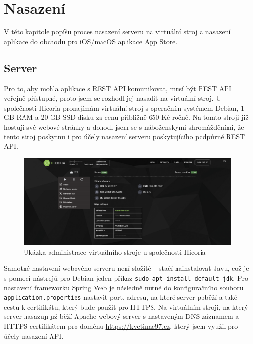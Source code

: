 \chapter{Nasazení}

\begin{chapterabstract}
    V této kapitole popíšu proces nasazení serveru na virtuální stroj a nasazení aplikace do obchodu pro iOS/macOS aplikace App Store.
\end{chapterabstract}

\section{Server}

Pro to, aby mohla aplikace s REST API komunikovat, musí být REST API veřejně přístupné, proto jsem se rozhodl jej nasadit na virtuální stroj. U společnosti Hicoria \cite{hicoria} pronajímám virtuální stroj s operačním systémem Debian, 1 GB RAM a 20 GB SSD disku za cenu přibližně 650 Kč ročně. Na tomto stroji již hostuji své webové stránky a dohodl jsem se s náboženskými shromážděními, že tento stroj poskytnu i pro účely nasazení serveru poskytujícího podpůrné REST API.

\begin{figure}[H]
    \includegraphics[width=\textwidth]{images/7-nasazeni/7-1-ukazka-hicoria.png}
    \caption{Ukázka administrace virtuálního stroje u společnosti Hicoria}
\end{figure}

Samotné nastavení webového serveru není složité -- stačí nainstalovat Javu, což je s pomocí nástrojů pro Debian jeden příkaz \texttt{sudo apt install default-jdk}. Pro nastavení frameworku Spring Web je následně nutné do konfiguračního souboru \texttt{application.properties} nastavit port, adresu, na které server poběží a také cestu k certifikátu, který bude použit pro HTTPS. Na virtuálním stroji, na který server nasazuji již běží Apache webový server s nastaveným DNS záznamem a HTTPS certifikátem pro doménu \url{https://kvetinac97.cz}, který jsem využil pro účely nasazení API.

